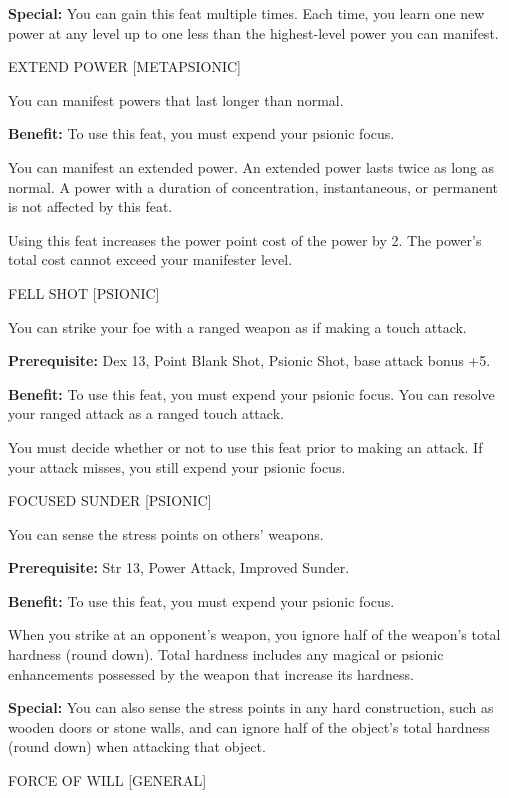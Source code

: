 \documentclass{article}
\begin{document}
\textbf{Special:} You can gain this feat multiple times. Each time, you learn one 
new power at any level up to one less than the highest-level power you can manifest.

\vspace{12pt}
EXTEND POWER [METAPSIONIC]

You can manifest powers that last longer than normal.

\textbf{Benefit:} To use this feat, you must expend your psionic focus.

You can manifest an extended power. An extended power lasts twice as long as normal. 
A power with a duration of concentration, instantaneous, or permanent is not affected 
by this feat.

Using this feat increases the power point cost of the power by 2. The power's total 
cost cannot exceed your manifester level.

\vspace{12pt}
FELL SHOT [PSIONIC]

You can strike your foe with a ranged weapon as if making a touch attack.

\textbf{Prerequisite:} Dex 13, Point Blank Shot, Psionic Shot, base attack bonus 
+5.

\textbf{Benefit:} To use this feat, you must expend your psionic focus. You can 
resolve your ranged attack as a ranged touch attack.

You must decide whether or not to use this feat prior to making an attack. If your 
attack misses, you still expend your psionic focus.

\vspace{12pt}
FOCUSED SUNDER [PSIONIC]

You can sense the stress points on others' weapons.

\textbf{Prerequisite:} Str 13, Power Attack, Improved Sunder.

\textbf{Benefit:} To use this feat, you must expend your psionic focus.

When you strike at an opponent's weapon, you ignore half of the weapon's total 
hardness (round down). Total hardness includes any magical or psionic enhancements 
possessed by the weapon that increase its hardness.

\textbf{Special:} You can also sense the stress points in any hard construction, 
such as wooden doors or stone walls, and can ignore half of the object's total 
hardness (round down) when attacking that object.

\vspace{12pt}
FORCE OF WILL [GENERAL]
\end{document}
